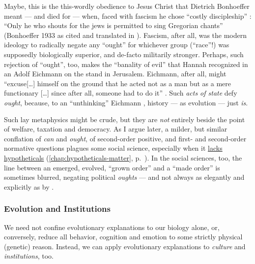 Maybe, this is the this-wordly obedience to Jesus Christ that Dietrich Bonhoeffer meant --- and died for --- when, faced with fascism he chose ``costly discipleship'' \citep{Bonhoeffer1937}:
``Only he who shouts for the jews is permitted to sing Gregorian chants'' (Bonhoeffer 1933 as cited and translated in \citealt[35]{DeGruchy1999}).
Fascism, after all, was the modern ideology to radically negate any ``ought'' for whichever group (``race''!) was supposedly biologically superior, and de-facto militarily stronger.
Perhaps, such rejection of ``ought'', too, makes the ``banality of evil'' that Hannah \cite{Arendt1963} recognized in an Adolf Eichmann on the stand in Jerusalem.
Eichmann, after all, might ``excuse[\ldots] himself on the ground that he acted not as a man but as a mere functionary [\ldots] since after all, someone had to do it'' \citep[K286f.]{Arendt1963}.
Such \emph{acts of state} defy \emph{ought}, because, to an ``unthinking'' Eichmann \citep[K187f.]{Arendt1963}, history --- as evolution --- just \emph{is}.

Such lay metaphysics might be crude, but they are \emph{not} entirely beside the point of welfare, taxation and democracy.
As I argue later, a milder, but similar conflation of \emph{can} and \emph{ought}, of second-order positive, and first- and second-order normative questions plagues some social science, especially when it \hyperref[chap:hypotheticals-matter]{lacks hypotheticals} (\autoref{chap:hypotheticals-matter}, p.~\pageref{chap:hypotheticals-matter}).
In the social sciences, too, the line between an emerged, evolved, ``grown order'' and a ``made order'' is sometimes blurred, negating political \emph{oughts} --- and not always as elegantly and explicitly as by \cite[37]{Hayek1973}.

\subsubsection{Evolution and Institutions}
We need not confine evolutionary explanations to our biology alone, or, conversely, reduce all behavior, cognition and emotion to some strictly physical (genetic) reason.
Instead, we can apply evolutionary explanations to \emph{culture} and \emph{institutions}, too.

